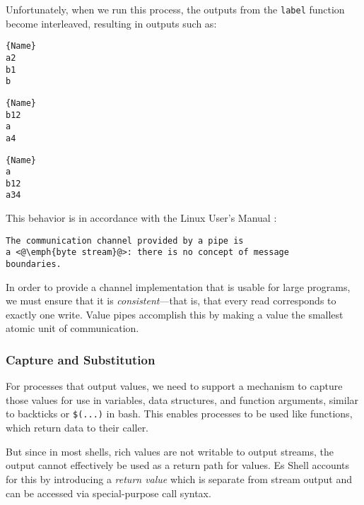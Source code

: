 \ifsigpro{ \documentclass[english,PRO]{ipsj} }
\begin{document}
\noindent
Unfortunately, when we run this process, the outputs from the \verb/label/ function become interleaved\footnotemark, resulting in outputs such as:

\noindent\begin{minipage}{.14\textwidth}
\begin{lstlisting}{Name}
a2
b1
b
\end{lstlisting}
\end{minipage}\hfill
\begin{minipage}{.14\textwidth}
\begin{lstlisting}{Name}
b12
a
a4

\end{lstlisting}
\end{minipage}\hfill
\begin{minipage}{.14\textwidth}
\begin{lstlisting}{Name}
a
b12
a34
\end{lstlisting}
\end{minipage}

\noindent
This behavior is in accordance with the Linux User's Manual \cite{linux-pipe}:
\begin{lstlisting}
The communication channel provided by a pipe is
a <@\emph{byte stream}@>: there is no concept of message
boundaries.
\end{lstlisting}

\noindent
In order to provide a channel implementation that is usable for large programs, we must ensure that it is \emph{consistent}---that is, that every read corresponds to exactly one write. Value pipes accomplish this by making a value the smallest atomic unit of communication.


\subsubsection{Capture and Substitution}\label{return-semantics}\noindent
For processes that output values, we need to support a mechanism to capture those values for use in variables, data structures, and function arguments, similar to backticks or \verb/$(...)/ in bash. This enables processes to be used like functions, which return data to their caller.

But since in most shells, rich values are not writable to output streams, the output cannot effectively be used as a return path for values. Es Shell\cite{haahr} accounts for this by introducing a \emph{return value} which is separate from stream output and can be accessed via special-purpose call syntax.
\end{document}
